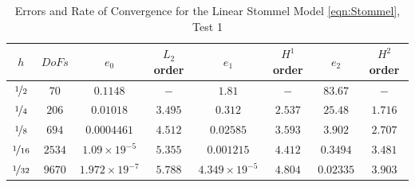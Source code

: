 \begin{table}[H]
\begin{center}
\begin{tabular}{|c|c|c|c|c|c|c|c|}%
  \hline
  $h$ & $DoFs$ & $e_0$ & $L_2$ order & $e_1$ & $H^1$ order & $e_2$ & $H^2$ order \\[0.2em] %
  \hline
  $\nicefrac{1}{2}$ & $70$ & $0.1148$ & $-$ & $1.81$ & $-$ & $83.67$ & $-$ \\[0.2em] %
  $\nicefrac{1}{4}$ & $206$ & $0.01018$ & $3.495$ & $0.312$ & $2.537$ & $25.48$ & $1.716$ \\[0.2em] %
  $\nicefrac{1}{8}$ & $694$ & $0.0004461$ & $4.512$ & $0.02585$ & $3.593$ & $3.902$ & $2.707$ \\[0.2em] %
  $\nicefrac{1}{16}$ & $2534$ & $1.09\times 19^{-5}$ & $5.355$ & $0.001215$ & $4.412$ & $0.3494$ & $3.481$ \\[0.2em] %
  $\nicefrac{1}{32}$ & $9670$ & $1.972\times 19^{-7}$ & $5.788$ & $4.349\times 19^{-5}$ & $4.804$ & $0.02335$ & $3.903$ \\[0.2em] %
  \hline
\end{tabular}
\end{center}
\caption{Errors and Rate of Convergence for the Linear Stommel Model \eqref{eqn:Stommel}, Test 1 \cite{Vallis06}} 
\label{tab:StommelErrorsVallis}
\end{table}


